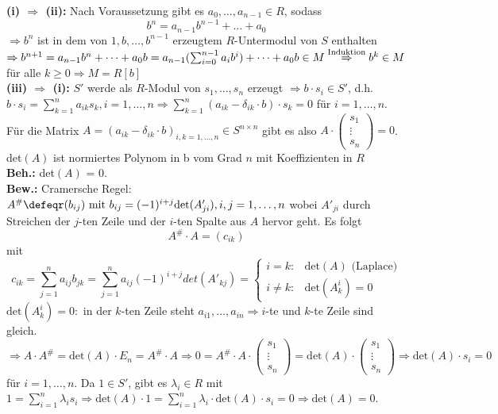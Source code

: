 \begin{Bew} 
  \textbf{(i) $\Rightarrow$ (ii):}
  Nach Voraussetzung gibt es $a_0, \dots , a_{n-1} \in R$, sodass 
  \[
  b^n = a_{n-1} b^{n-1} + \dots + a_0
  \] 
  $\Rightarrow b^n$ ist in dem von $1, b, \dots , b^{n-1}$
  erzeugtem $R$-Untermodul von $S$ enthalten $\Rightarrow b^{n+1} = a_{n-1} b^n
  + \dots + a_0 b = a_{n-1} (\sum_{i=0}^{n-1} a_i b^i) + \dots + a_0 b \in M
  \overset{\mbox{\scriptsize Induktion}}{\Rightarrow} b^k \in M$ für alle $k \ge
  0 \Rightarrow M = R[b]$\\
  \textbf{(iii) $\Rightarrow$ (i):}
  $S'$ werde als $R$-Modul von $s_1, \dots , s_n$ erzeugt $\Rightarrow b \cdot
  s_i \in S'$, d.h. $b \cdot s_i = \sum_{k = 1}^n a_{i k} s_k, i=1,\dots,n
  \Rightarrow \sum_{k = 1}^n (a_{i k} -\delta_{i k} \cdot b) \cdot s_k = 0$ für
  $i=1, \dots, n$.\\
  Für die Matrix $A = (a_{i k} - \delta_{i k} \cdot b)_{i,k =1, \dots, n} \in S
  ^{n \times n}$ gibt es also $A \cdot \begin{pmatrix}s_1 \\ \vdots \\ s_n
  \end{pmatrix} = 0$.
  det$(A)$ ist normiertes Polynom in b vom Grad $n$ mit Koeffizienten in $R$\\
  \textbf{Beh.:} det$(A)$ = 0.\\
  \textbf{Bew.:} Cramersche Regel:\\
  $A^{\#} \defeqr (b_{i j}) \mbox{ mit } b_{i j} = (-1)^{i+j} \mbox{det}(A'_{j
  i}), i,j= 1, \dots, n$ wobei $A'_{j i}$ durch Streichen der $j$-ten Zeile und
  der $i$-ten Spalte aus $A$ hervor geht. Es folgt 
  \[
  A^{\#} \cdot A = (c_{i k})
  \]
  mit
\[ c_{i k} = \sum_{j = 1}^n a_{i j} b_{j
  k} =
  \sum_{j = 1}^n a_{i j} (-1)^{i+j} det(A'_{k j}) = \begin{cases}
  i=k: & \mbox{det}(A) \mbox{ (Laplace)}\\
  i \not= k: & \mbox{det}(A_k^i) = 0
  \end{cases}
\]
  $\mbox{det}(A_k^i) = 0:$ in der $k$-ten Zeile steht $a_{i 1}, \dots , a_{i n}
  \Rightarrow i$-te und $k$-te Zeile sind gleich.\\
  $\Rightarrow A \cdot A^{\#} = \mbox{det}(A) \cdot E_n = A^{\#} \cdot A
  \Rightarrow 0 = A^{\#} \cdot A \cdot \begin{pmatrix}s_1 \\ \vdots \\ s_n 
  \end{pmatrix} = \mbox{det}(A) \cdot \begin{pmatrix}s_1 \\ \vdots \\ s_n 
  \end{pmatrix} \Rightarrow \mbox{det}(A) \cdot s_i = 0$ für $i = 1, \dots,
  n$.
  Da $1 \in S'$, gibt es $\lambda_i \in R$ mit $1 = \sum_{i=1}^n \lambda_i s_i
  \Rightarrow \mbox{det}(A) \cdot 1 = \sum_{i=1}^n \lambda_i \cdot \mbox{det}(A)
  \cdot s_i = 0 \Rightarrow \mbox{det}(A) = 0$.
\end{Bew}

